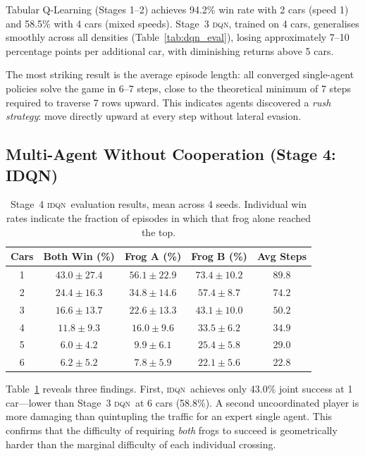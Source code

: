 \documentclass[12pt]{article}
\newcommand{\IDQN}{\textsc{idqn}}
\newcommand{\DQN}{\textsc{dqn}}
\begin{document}
Tabular Q-Learning (Stages 1--2) achieves 94.2\% win rate with 2 cars (speed
1) and 58.5\% with 4 cars (mixed speeds).  Stage~3 \DQN, trained on 4 cars,
generalises smoothly across all densities (Table~\ref{tab:dqn_eval}), losing
approximately 7--10 percentage points per additional car, with diminishing
returns above 5 cars.

The most striking result is the average episode length: all converged
single-agent policies solve the game in 6--7 steps, close to the theoretical
minimum of 7 steps required to traverse 7 rows upward.  This indicates agents
discovered a \emph{rush strategy}: move directly upward at every step without
lateral evasion.

\subsection{Multi-Agent Without Cooperation (Stage 4: IDQN)}
\label{sec:results_idqn}

\begin{table}[h]
\centering
\caption{Stage~4 \IDQN\ evaluation results, mean across 4 seeds.
  Individual win rates indicate the fraction of episodes in which
  that frog alone reached the top.}
\label{tab:idqn_eval}
\renewcommand{\arraystretch}{1.2}
\begin{tabular}{ccccc}
\toprule
\textbf{Cars} & \textbf{Both Win (\%)} & \textbf{Frog A (\%)}
  & \textbf{Frog B (\%)} & \textbf{Avg Steps} \\
\midrule
1 & $43.0 \pm 27.4$ & $56.1 \pm 22.9$ & $73.4 \pm 10.2$ & $89.8$ \\
2 & $24.4 \pm 16.3$ & $34.8 \pm 14.6$ & $57.4 \pm 8.7$  & $74.2$ \\
3 & $16.6 \pm 13.7$ & $22.6 \pm 13.3$ & $43.1 \pm 10.0$ & $50.2$ \\
4 & $11.8 \pm 9.3$  & $16.0 \pm 9.6$  & $33.5 \pm 6.2$  & $34.9$ \\
5 & $ 6.0 \pm 4.2$  & $ 9.9 \pm 6.1$  & $25.4 \pm 5.8$  & $29.0$ \\
6 & $ 6.2 \pm 5.2$  & $ 7.8 \pm 5.9$  & $22.1 \pm 5.6$  & $22.8$ \\
\bottomrule
\end{tabular}
\end{table}

Table~\ref{tab:idqn_eval} reveals three findings.  First, \IDQN\ achieves only
43.0\% joint success at 1 car—lower than Stage~3 \DQN\ at 6 cars (58.8\%).
A second uncoordinated player is more damaging than quintupling the traffic
for an expert single agent.  This confirms that the difficulty of requiring
\emph{both} frogs to succeed is geometrically harder than the marginal
difficulty of each individual crossing.
\end{document}
